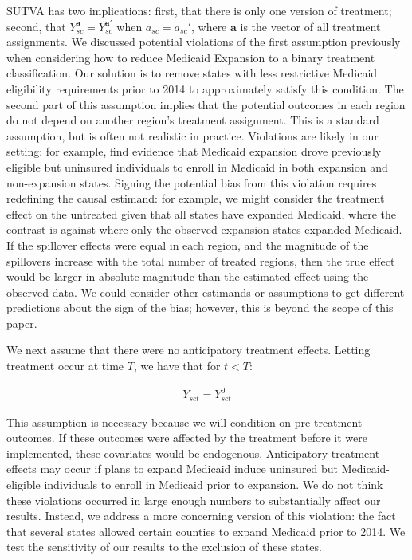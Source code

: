 \documentclass[article]{imsart}
\theoremstyle{plain}
\theoremstyle{remark}
\begin{document}
SUTVA has two implications: first, that there is only one version of treatment; second, that $Y_{sc}^{\mathbf{a}} = Y_{sc}^{\mathbf{a}'}$ when $a_{sc} = a_{sc}'$, where $\mathbf{a}$ is the vector of all treatment assignments. We discussed potential violations of the first assumption previously when considering how to reduce Medicaid Expansion to a binary treatment classification. Our solution is to remove states with less restrictive Medicaid eligibility requirements prior to 2014 to approximately satisfy this condition. The second part of this assumption implies that the potential outcomes in each region do not depend on another region's treatment assignment. This is a standard assumption, but is often not realistic in practice. Violations are likely in our setting: for example, \cite{frean2017premium} find evidence that Medicaid expansion drove previously eligible but uninsured individuals to enroll in Medicaid in both expansion and non-expansion states. Signing the potential bias from this violation requires redefining the causal estimand: for example, we might consider the treatment effect on the untreated given that all states have expanded Medicaid, where the contrast is against where only the observed expansion states expanded Medicaid. If the spillover effects were equal in each region, and the magnitude of the spillovers increase with the total number of treated regions, then the true effect would be larger in absolute magnitude than the estimated effect using the observed data. We could consider other estimands or assumptions to get different predictions about the sign of the bias; however, this is beyond the scope of this paper.

We next assume that there were no anticipatory treatment effects. Letting treatment occur at time $T$, we have that for $t < T$:

\begin{align*}
Y_{sct} = Y_{sct}^0
\end{align*}

This assumption is necessary because we will condition on pre-treatment outcomes. If these outcomes were affected by the treatment before it were implemented, these covariates would be endogenous. Anticipatory treatment effects may occur if plans to expand Medicaid induce uninsured but Medicaid-eligible individuals to enroll in Medicaid prior to expansion. We do not think these violations occurred in large enough numbers to substantially affect our results. Instead, we address a more concerning version of this violation: the fact that several states allowed certain counties to expand Medicaid prior to 2014. We test the sensitivity of our results to the exclusion of these states.
\end{document}
